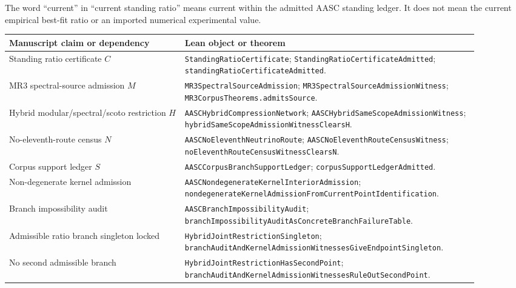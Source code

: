 \documentclass[11pt]{article}
\theoremstyle{definition}
\begin{document}
The word ``current'' in ``current standing ratio'' means current within the
admitted AASC standing ledger. It does not mean the current empirical best-fit
ratio or an imported numerical experimental value.

\begin{center}
\small
\begin{tabular}{>{\raggedright\arraybackslash}p{0.34\linewidth}
                >{\raggedright\arraybackslash}p{0.56\linewidth}}
\toprule
Manuscript claim or dependency & Lean object or theorem \\
\midrule
Standing ratio certificate \(C\) &
\texttt{StandingRatioCertificate};
\texttt{StandingRatioCertificateAdmitted};
\texttt{standingRatioCertificateAdmitted}. \\
\addlinespace
MR3 spectral-source admission \(M\) &
\texttt{MR3SpectralSourceAdmission};
\texttt{MR3SpectralSourceAdmissionWitness};
\texttt{MR3CorpusTheorems.admitsSource}. \\
\addlinespace
Hybrid modular/spectral/scoto restriction \(H\) &
\texttt{AASCHybridCompressionNetwork};
\texttt{AASCHybridSameScopeAdmissionWitness};
\texttt{hybridSameScopeAdmissionWitnessClearsH}. \\
\addlinespace
No-eleventh-route census \(N\) &
\texttt{AASCNoEleventhNeutrinoRoute};
\texttt{AASCNoEleventhRouteCensusWitness};
\texttt{noEleventhRouteCensusWitnessClearsN}. \\
\addlinespace
Corpus support ledger \(S\) &
\texttt{AASCCorpusBranchSupportLedger};
\texttt{corpusSupportLedgerAdmitted}. \\
\addlinespace
Non-degenerate kernel admission &
\texttt{AASCNondegenerateKernelInteriorAdmission};
\texttt{nondegenerateKernelAdmissionFromCurrentPointIdentification}. \\
\addlinespace
Branch impossibility audit &
\texttt{AASCBranchImpossibilityAudit};
\texttt{branchImpossibilityAuditAsConcreteBranchFailureTable}. \\
\addlinespace
Admissible ratio branch singleton locked &
\texttt{HybridJointRestrictionSingleton};
\texttt{branchAuditAndKernelAdmissionWitnessesGiveEndpointSingleton}. \\
\addlinespace
No second admissible branch &
\texttt{HybridJointRestrictionHasSecondPoint};
\texttt{branchAuditAndKernelAdmissionWitnessesRuleOutSecondPoint}. \\
\bottomrule
\end{tabular}
\end{center}
\end{document}
